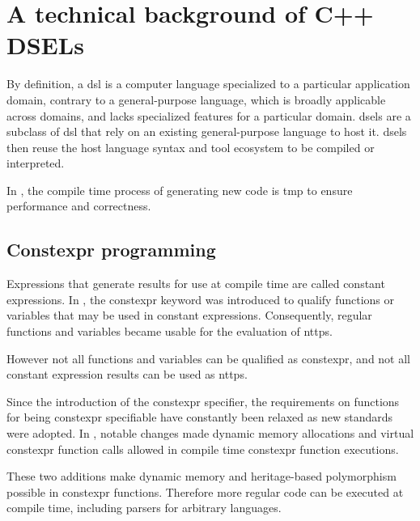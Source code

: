 \documentclass[../main]{subfiles}
\begin{document}

\section{
  A technical background of C++ DSELs
}

By definition, a \gls{dsl} is a computer language
specialized to a particular application domain, contrary to a general-purpose
language, which is broadly applicable across domains, and lacks specialized
features for a particular domain. \glspl{dsel}
are a subclass of \gls{dsl} that rely on an existing general-purpose language to host
it. \glspl{dsel} then reuse the host language syntax and tool ecosystem to be compiled
or interpreted.

In \cpp, the compile time process of generating new code is
\gls{tmp} to ensure performance and correctness.


\subsection{
  Constexpr programming
}
\label{lbl:constexpr-programming}

Expressions that generate results for use at compile time are called
constant expressions. In , the \gls{constexpr} keyword was introduced
to qualify functions or variables that may be used in constant expressions.
Consequently, regular functions and variables became usable for the evaluation
of \glspl{nttp}.

However not all functions and variables can be qualified as \gls{constexpr},
and not all constant expression results can be used as \glspl{nttp}.

Since the introduction of the \gls{constexpr} specifier, the requirements on
functions for being \gls{constexpr} specifiable have constantly been relaxed as new
\cpp standards were adopted. In , notable changes made dynamic memory
allocations\cite{constexpr-memory} and virtual \gls{constexpr} function
calls\cite{virtual-constexpr} allowed in compile time \gls{constexpr} function
executions.

These two additions make dynamic memory and heritage-based polymorphism
possible in \gls{constexpr} functions. Therefore more regular \cpp code can be
executed at compile time, including parsers for arbitrary languages.
\end{document}
